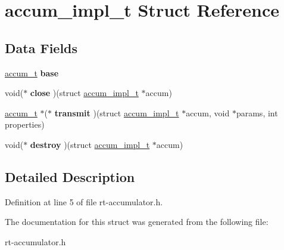 \hypertarget{structaccum__impl__t}{\section{accum\-\_\-impl\-\_\-t Struct Reference}
\label{structaccum__impl__t}
}
\subsection*{Data Fields}
\begin{DoxyCompactItemize}
\item 
\hypertarget{structaccum__impl__t_a17125fed871cce44faf126b6300a5d2b}{\hyperlink{structaccum__t}{accum\-\_\-t} {\bfseries base}}\label{structaccum__impl__t_a17125fed871cce44faf126b6300a5d2b}

\item 
\hypertarget{structaccum__impl__t_ad084ee0f84fd540cfef5779fc47c35ec}{void($\ast$ {\bfseries close} )(struct \hyperlink{structaccum__impl__t}{accum\-\_\-impl\-\_\-t} $\ast$accum)}\label{structaccum__impl__t_ad084ee0f84fd540cfef5779fc47c35ec}

\item 
\hypertarget{structaccum__impl__t_a2c8dcb748e5deeb64cd82c9849bddab9}{\hyperlink{structaccum__t}{accum\-\_\-t} $\ast$($\ast$ {\bfseries transmit} )(struct \hyperlink{structaccum__impl__t}{accum\-\_\-impl\-\_\-t} $\ast$accum, void $\ast$params, int properties)}\label{structaccum__impl__t_a2c8dcb748e5deeb64cd82c9849bddab9}

\item 
\hypertarget{structaccum__impl__t_a36cccd60984b098765d0793418d71226}{void($\ast$ {\bfseries destroy} )(struct \hyperlink{structaccum__impl__t}{accum\-\_\-impl\-\_\-t} $\ast$accum)}\label{structaccum__impl__t_a36cccd60984b098765d0793418d71226}

\end{DoxyCompactItemize}


\subsection{Detailed Description}


Definition at line 5 of file rt-\/accumulator.\-h.



The documentation for this struct was generated from the following file\-:\begin{DoxyCompactItemize}
\item 
rt-\/accumulator.\-h\end{DoxyCompactItemize}
